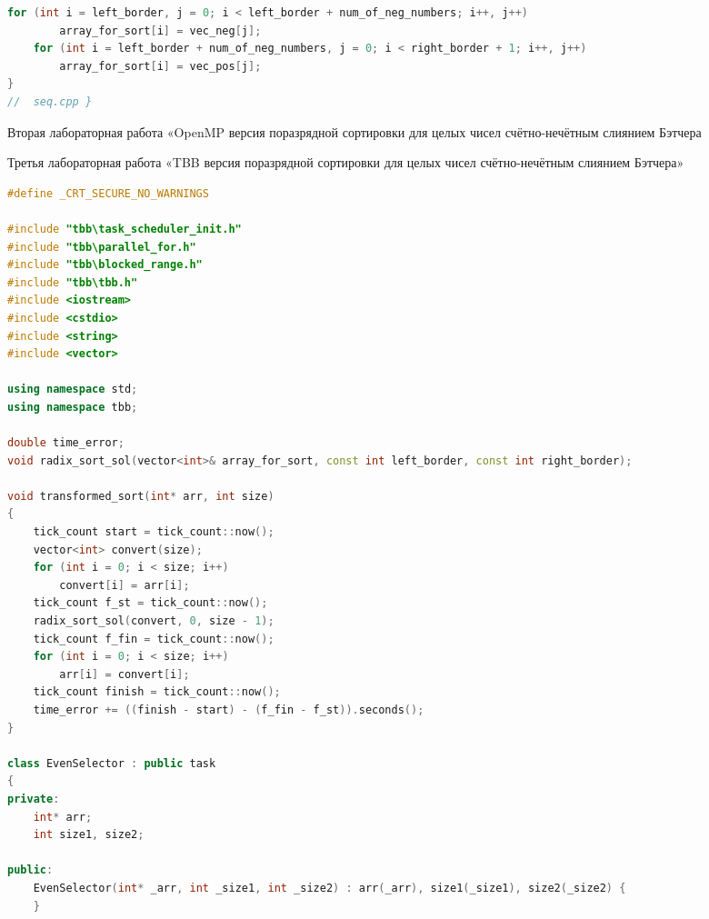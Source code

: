\documentclass[a4paper,final]{report}
\begin{document}
\begin{spacing}{1.5}
\begin{lstlisting}[language=C++]
	for (int i = left_border, j = 0; i < left_border + num_of_neg_numbers; i++, j++)
		array_for_sort[i] = vec_neg[j];
	for (int i = left_border + num_of_neg_numbers, j = 0; i < right_border + 1; i++, j++)
		array_for_sort[i] = vec_pos[j];
}
//  seq.cpp }
\end{lstlisting} 


\par Вторая лабораторная работа «OpenMP версия поразрядной сортировки для целых чисел счётно-нечётным слиянием Бэтчера





\par Третья лабораторная работа «TBB версия поразрядной сортировки для целых чисел счётно-нечётным слиянием Бэтчера»
\begin{spacing}{0}
\end{spacing}

\begin{lstlisting}[language=C++]
#define _CRT_SECURE_NO_WARNINGS

#include "tbb\task_scheduler_init.h"
#include "tbb\parallel_for.h"
#include "tbb\blocked_range.h"
#include "tbb\tbb.h"
#include <iostream>
#include <cstdio>
#include <string>
#include <vector>

using namespace std;
using namespace tbb;

double time_error;
void radix_sort_sol(vector<int>& array_for_sort, const int left_border, const int right_border);

void transformed_sort(int* arr, int size)
{
	tick_count start = tick_count::now();
	vector<int> convert(size);
	for (int i = 0; i < size; i++)
		convert[i] = arr[i];
	tick_count f_st = tick_count::now();
	radix_sort_sol(convert, 0, size - 1);
	tick_count f_fin = tick_count::now();
	for (int i = 0; i < size; i++)
		arr[i] = convert[i];
	tick_count finish = tick_count::now();
	time_error += ((finish - start) - (f_fin - f_st)).seconds();
}

class EvenSelector : public task
{
private:
	int* arr;
	int size1, size2;

public:
	EvenSelector(int* _arr, int _size1, int _size2) : arr(_arr), size1(_size1), size2(_size2) {
	}


\end{lstlisting}
\end{spacing}
\end{document}
